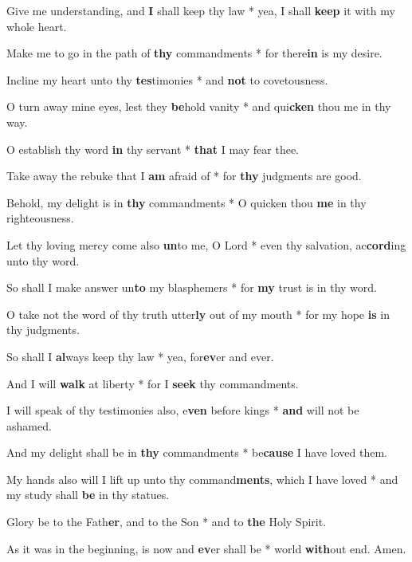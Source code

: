 \begin{multicols}{2}
	Give me understanding, and \textbf{I} shall keep thy law * yea, I shall \textbf{keep} it with my whole heart.
	
	Make me to go in the path of \textbf{thy} commandments * for there\textbf{in} is my desire.
	
	Incline my heart unto thy \textbf{tes}timonies * and \textbf{not} to covetousness.
	
	O turn away mine eyes, lest they \textbf{be}hold vanity * and qui\textbf{cken} thou me in thy way.
	
	O establish thy word \textbf{in} thy servant * \textbf{that} I may fear thee.
	
	Take away the rebuke that I \textbf{am} afraid of * for \textbf{thy} judgments are good.
	
	Behold, my delight is in \textbf{thy} commandments * O quicken thou \textbf{me} in thy righteousness.
	
	Let thy loving mercy come also \textbf{un}to me, O Lord * even thy salvation, ac\textbf{cord}ing unto thy word.
	
	So shall I make answer un\textbf{to} my blasphemers * for \textbf{my} trust is in thy word.
	
	O take not the word of thy truth utter\textbf{ly} out of my mouth * for my hope \textbf{is} in thy judgments.
	
	So shall I \textbf{al}ways keep thy law * yea, for\textbf{ev}er and ever.
	
	And I will \textbf{walk} at liberty * for I \textbf{seek} thy commandments.
	
	I will speak of thy testimonies also, e\textbf{ven} before kings * \textbf{and} will not be ashamed.
	
	And my delight shall be in \textbf{thy} commandments * be\textbf{cause} I have loved them.
	
	My hands also will I lift up unto thy command\textbf{ments}, which I have loved * and my study shall \textbf{be} in thy statues.
	
	Glory be to the Fath\textbf{er}, and to the Son * and to \textbf{the} Holy Spirit.
	
	As it was in the beginning, is now and \textbf{ev}er shall be * world \textbf{with}out end. Amen.
\end{multicols}